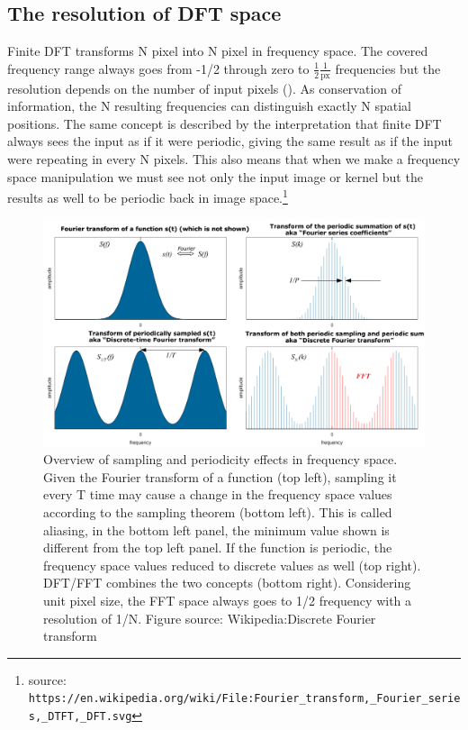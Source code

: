 \documentclass[11pt]{article}
\begin{document}
\subsection{The resolution of DFT space\label{sec:dft}}
\par Finite DFT transforms N pixel into N pixel in frequency space. The
covered frequency range always goes from -1/2 through zero to \(\frac{1}{2}
\frac{1}{\mathrm{px}}\) frequencies but the resolution depends on the number
of input pixels (). As conservation of information,
the N resulting frequencies can distinguish exactly N spatial positions. The
same concept is described by the interpretation that finite DFT always sees
the input as if it were periodic, giving the same result as if the input
were repeating in every N pixels. This also means that when we make a
frequency space manipulation we must see not only the input image or kernel
but the results as well to be periodic back in image
space.\footnote{ source:
  \texttt{https://en.wikipedia.org/wiki/File:Fourier\_transform,\_Fourier\_series,\_DTFT,\_DFT.svg}}
\begin{figure}[h]
\begin{center}
\includegraphics[width=5.5in]{fig/dft_sampling.pdf}
\end{center}
\caption{\label{fig:dft_sampling}Overview of sampling and periodicity
  effects in frequency space. Given the Fourier transform of a
  function (top left), sampling it every T time may cause a change in
  the frequency space values according to the sampling theorem (bottom
  left). This is called aliasing, in the bottom left panel, the
  minimum value shown is different from the top left panel. If the
  function is periodic, the frequency space values reduced to discrete
  values as well (top right). DFT/FFT combines the two concepts
  (bottom right). Considering unit pixel size, the FFT space always
  goes to 1/2 frequency with a resolution of 1/N. Figure source:
  Wikipedia:Discrete Fourier transform}
\end{figure}
%
\end{document}
